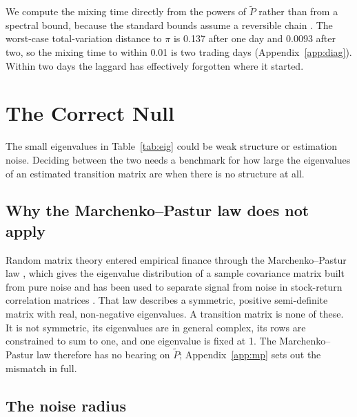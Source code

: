 \documentclass[11pt]{article}
\begin{document}
We compute the mixing time directly from the powers of $\tilde P$ rather than from a spectral bound, because the standard bounds assume a reversible chain \cite{levinperes2017}. The worst-case total-variation distance to $\pi$ is 0.137 after one day and 0.0093 after two, so the mixing time to within 0.01 is two trading days (Appendix~\ref{app:diag}). Within two days the laggard has effectively forgotten where it started.

\clearpage
\section{The Correct Null}
\label{sec:null}

The small eigenvalues in Table~\ref{tab:eig} could be weak structure or estimation noise. Deciding between the two needs a benchmark for how large the eigenvalues of an estimated transition matrix are when there is no structure at all.

\subsection{Why the Marchenko--Pastur law does not apply}
\label{sec:mp}

Random matrix theory entered empirical finance through the Marchenko--Pastur law \cite{marchenkopastur1967}, which gives the eigenvalue distribution of a sample covariance matrix built from pure noise and has been used to separate signal from noise in stock-return correlation matrices \cite{lalouxetal1999,plerouetal2000}. That law describes a symmetric, positive semi-definite matrix with real, non-negative eigenvalues. A transition matrix is none of these. It is not symmetric, its eigenvalues are in general complex, its rows are constrained to sum to one, and one eigenvalue is fixed at 1. The Marchenko--Pastur law therefore has no bearing on $\tilde P$; Appendix~\ref{app:mp} sets out the mismatch in full.

\subsection{The noise radius}
\label{sec:radius}
\end{document}
